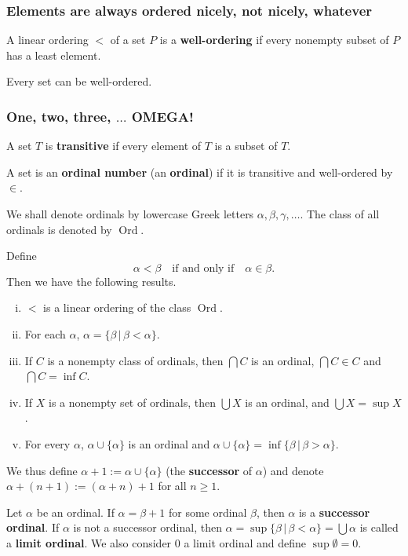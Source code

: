 \subsubsection{Elements are always ordered nicely, not nicely, whatever}
\begin{definition}
	A linear ordering $<$ of a set $P$ is a \textbf{well-ordering} if every nonempty subset of $P$ has a least element.
\end{definition}
\begin{theorem} \label{thm-well-ordering}
	Every set can be
	well-ordered.
\end{theorem}

\subsubsection{One, two, three, $\dots$ OMEGA!}
\begin{definition}
	A set $T$ is \textbf{transitive} if every element of $T$ is a subset of $T$.
\end{definition}
\begin{definition}
	A set is an \textbf{ordinal number} (an \textbf{ordinal}) if it is transitive and well-ordered by $\in$.
\end{definition}
We shall denote ordinals by lowercase Greek letters $\alpha, \beta, \gamma, \dots$. The class of all ordinals is denoted by $\operatorname{Ord}$.
\begin{proposition}
	Define
	\[ \alpha < \beta \quad \text{if and only if} \quad \alpha \in \beta. \]
	Then we have the following results.
	\begin{enumerate}[(i)]
		\item $<$ is a linear ordering of the class $\operatorname{Ord}$.
		\item For each $\alpha$, $\alpha = \{ \beta \,|\, \beta < \alpha \}$.
		\item If $C$ is a nonempty class of ordinals, then $\bigcap C$ is an ordinal, $\bigcap C \in C$ and $\bigcap C = \inf C$.
		\item If $X$ is a nonempty set of ordinals, then $\bigcup X$ is an ordinal, and $\bigcup X = \sup X$.
		\item For every $\alpha$, $\alpha \cup \{ \alpha \}$ is an ordinal and $\alpha \cup \{ \alpha \} = \inf \{ \beta \,|\, \beta > \alpha \}$.
	\end{enumerate}
\end{proposition}
We thus define $\alpha + 1 := \alpha \cup \{ \alpha \}$ (the \textbf{successor} of $\alpha$) and denote $\alpha + (n+1) := (\alpha+n)+1$ for all $n\geq 1$. 
\begin{definition}
	Let $\alpha$ be an ordinal. If $\alpha = \beta + 1$ for some ordinal $\beta$, then $\alpha$ is a \textbf{successor ordinal}. If $\alpha$ is not a successor ordinal, then $\alpha = \sup\{\beta \,|\, \beta < \alpha \} = \bigcup \alpha$ is called a \textbf{limit ordinal}. We also consider $0$ a limit ordinal and define $\sup \emptyset = 0$.
\end{definition}

